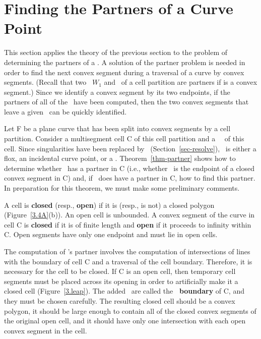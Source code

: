 %
%
\section{Finding the Partners of a Curve Point}
\label{sec-3.2}

This section applies the theory of the previous section to the
problem of determining the partners of a \wallpoint.
A solution of the partner problem is needed in order to find 
the next convex segment during a traversal of a curve by convex segments.
(Recall that two \wallpoints\ $W_{1}$ and \wt\ of a cell partition
are partners if \arc{\wo\wt} is a convex segment.)
Since we identify a convex segment by its two endpoints,
if the partners of all of the \wallpoints\ have been computed, then
the two convex segments that leave a given \wallpoint\ can be 
quickly identified.

Let F be a plane curve that has been split
into convex segments by a cell partition.
Consider a multisegment cell C of this cell partition and a \wallpoint\
\wo\ of this cell.
Since singularities have been replaced by \pseudos\ 
(Section~\ref{sec-resolve}), \wo\ is either a flox, an incidental curve
point, or a \pseudo.
Theorem~\ref{thm-partner} shows how to determine whether \wo\ has a partner
in C (i.e., whether \wo\ is the endpoint of a closed convex segment in C)
and, if \wo\ does have a partner in C, how to find this partner.
In preparation for this theorem, we must make some preliminary comments.
%
\begin{definition}
A cell is {\bf closed} (resp., {\bf open}) if it is (resp., is not)
a closed polygon (Figure~\ref{3.4A}(b)).
An open cell is unbounded.
A convex segment of the curve in cell C is {\bf closed} if it is of 
finite length and 
{\bf open} if it proceeds to infinity within C.
Open segments have only one endpoint and must lie in open cells.
\end{definition}

The computation of \wo's partner involves the computation of intersections
of lines with the boundary of cell C and a traversal of the cell boundary.
Therefore, it is necessary for the cell to be closed.
If C is an open cell, then temporary cell segments must be placed across
its opening in order to artificially make it a closed cell
(Figure~\ref{3.leap}).
The added \cellsegments\ are called the {\bf \artificial\ boundary} of C, and
they must be chosen carefully.
The resulting closed cell should be a convex polygon, it should be large 
enough to contain all of the closed convex segments of the original open cell,
and it should have only one intersection with each open convex segment in the
cell.

